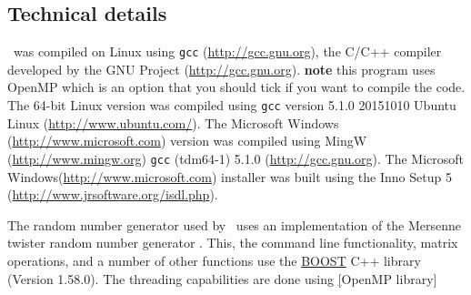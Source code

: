 \subsection{Technical details}\label{sec:tech}

\IBM\ was compiled on Linux using \texttt{gcc} (\url{http://gcc.gnu.org}), the C/C++ compiler developed by the GNU Project (\url{http://gcc.gnu.org}). \textbf{note} this program uses OpenMP which is an option that you should tick if you want to compile the code. The 64-bit Linux  version was compiled using \texttt{gcc} version 5.1.0 20151010 Ubuntu Linux (\url{http://www.ubuntu.com/}). The Microsoft Windows (\url{http://www.microsoft.com}) version was compiled using MingW (\url{http://www.mingw.org}) \texttt{gcc} (tdm64-1) 5.1.0 (\url{http://gcc.gnu.org}). The Microsoft Windows(\url{http://www.microsoft.com}) installer was built using the Inno Setup 5 (\url{http://www.jrsoftware.org/isdl.php}).

The random number generator used by \IBM\ uses an implementation of the Mersenne twister random number generator \citep{796}. This, the command line functionality, matrix operations, and a number of other functions use the \href{http://www.boost.org/}{BOOST} C++ library (Version 1.58.0). The threading capabilities are done using \href{https://www.openmp.org/}[OpenMP library]


